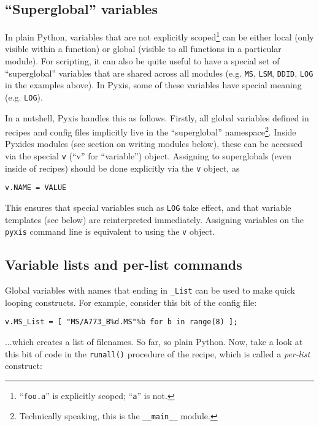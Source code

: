 \documentclass[a4paper,10pt]{article}
\begin{document}
\subsection{``Superglobal'' variables}
\label{sec:superglobals}

In plain Python, variables that are not explicitly scoped\footnote{``{\tt foo.a}'' is explicitly scoped; ``{\tt a}'' is not.} can be either local (only visible within a function) or global (visible to all functions in a particular module). For scripting, it can
also be quite useful to have a special set of ``superglobal'' variables that are shared across all modules (e.g. {\tt MS}, {\tt LSM}, {\tt DDID}, {\tt LOG} in the examples above). In Pyxis, some of these variables have special meaning (e.g. {\tt LOG}). 

In a nutshell, Pyxis handles this as follows. Firstly, all global variables defined in recipes and config files implicitly live in the ``superglobal'' namespace\footnote{Technically speaking, this is the {\tt \_\_main\_\_} module.}. Inside Pyxides modules (see section on writing modules below), these can be accessed via the special {\tt v} (``v'' for ``variable'') object. Assigning to superglobals (even inside of recipes) should be done explicitly via the {\tt v} object, as 

\begin{verbatim}
v.NAME = VALUE  
\end{verbatim}

This ensures that special variables such as {\tt LOG} take effect, and that variable templates (see below) are reinterpreted immediately. Assigning variables on the {\tt pyxis} command line is equivalent to using the {\tt v} object.

\subsection{Variable lists and per-list commands}

Global variables with names that ending in {\tt \_List} can be used to make quick looping constructs. For example, consider 
this bit of the config file:

\begin{verbatim}
v.MS_List = [ "MS/A773_B%d.MS"%b for b in range(8) ];
\end{verbatim}

...which creates a list of filenames. So far, so plain Python. Now, take a look at this bit of code in 
the {\tt runall()} procedure of the recipe, which is called a {\em per-list} construct:
\end{document}
